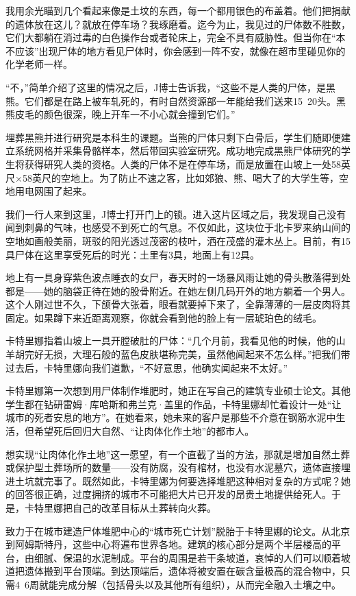 \documentclass[12pt,oneside]{book}
\begin{document}
\begin{bookref}[frametitle={\cite{好好告别：世界葬礼观察手记}}]
我用余光瞄到几个看起来像是土坟的东西，每一个都用银色的布盖着。他们把捐献的遗体放在这儿？就放在停车场？我琢磨着。迄今为止，我见过的尸体数不胜数，它们大都躺在消过毒的白色操作台或者轮床上，完全不具有威胁性。但当你在“本不应该”出现尸体的地方看见尸体时，你会感到一阵不安，就像在超市里碰见你的化学老师一样。

“不，”简单介绍了这里的情况之后，J博士告诉我，“这些不是人类的尸体，是黑熊。它们都是在路上被车轧死的，有时自然资源部一年能给我们送来15~20头。黑熊皮毛的颜色很深，晚上开车一不小心就会撞到它们。”

埋葬黑熊并进行研究是本科生的课题。当熊的尸体只剩下白骨后，学生们随即便建立系统网格并采集骨骼样本，然后带回实验室研究。成功地完成黑熊尸体研究的学生将获得研究人类的资格。人类的尸体不是在停车场，而是放置在山坡上一处58英尺×58英尺的空地上。为了防止不速之客，比如郊狼、熊、喝大了的大学生等，空地用电网围了起来。

我们一行人来到这里，J博士打开门上的锁。进入这片区域之后，我发现自己没有闻到刺鼻的气味，也感受不到死亡的气息。不仅如此，这块位于北卡罗来纳山间的空地如画般美丽，斑驳的阳光透过茂密的枝叶，洒在茂盛的灌木丛上。目前，有15具尸体在这里享受死后的时光：土里有3具，地面上有12具。

地上有一具身穿紫色波点睡衣的女尸，春天时的一场暴风雨让她的骨头散落得到处都是——她的脑袋正待在她的股骨附近。在她左侧几码开外的地方躺着一个男人。这个人刚过世不久，下颌骨大张着，眼看就要掉下来了，全靠薄薄的一层皮肉将其固定。如果蹲下来近距离观察，你就会看到他的脸上有一层琥珀色的绒毛。

卡特里娜指着山坡上一具开膛破肚的尸体：“几个月前，我看见他的时候，他的山羊胡完好无损，大理石般的蓝色皮肤堪称完美，虽然他闻起来不怎么样。”把我们带过去后，卡特里娜向我们道歉，“不好意思，他确实闻起来不太好。”

卡特里娜第一次想到用尸体制作堆肥时，她正在写自己的建筑专业硕士论文。其他学生都在钻研雷姆·库哈斯和弗兰克·盖里的作品，卡特里娜却忙着设计一处“让城市的死者安息的地方”。在她看来，她未来的客户是那些不介意在钢筋水泥中生活，但希望死后回归大自然、“让肉体化作土地”的都市人。

想实现“让肉体化作土地”这一愿望，有一个直截了当的方法，那就是增加自然土葬或保护型土葬场所的数量——没有防腐，没有棺材，也没有水泥墓穴，遗体直接埋进土坑就完事了。既然如此，卡特里娜为何要选择堆肥这种相对复杂的方式呢？她的回答很正确，过度拥挤的城市不可能把大片已开发的昂贵土地提供给死人。于是，卡特里娜把自己的改革目标从土葬转向火葬。

致力于在城市建造尸体堆肥中心的“城市死亡计划”脱胎于卡特里娜的论文。从北京到阿姆斯特丹，这些中心将遍布世界各地。建筑的核心部分是两个半层楼高的平台，由细腻、保温的水泥制成。平台的周围是若干条坡道，哀悼的人们可以顺着坡道把遗体搬到平台顶端。到达顶端后，遗体将被安置在碳含量极高的混合物中，只需4~6周就能完成分解（包括骨头以及其他所有组织），从而完全融入土壤之中。


\end{bookref}
\end{document}
